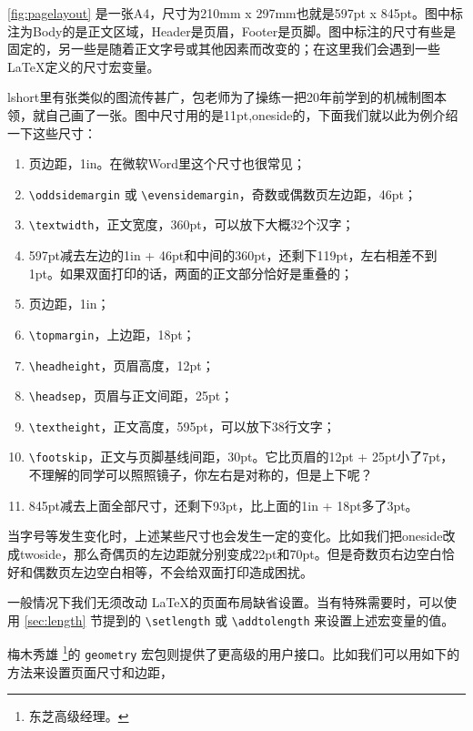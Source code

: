 \autoref{fig:pagelayout} 是一张A4，尺寸为210mm x 297mm也就是597pt x 845pt。图中标注为Body的是正文区域，Header是页眉，Footer是页脚。图中标注的尺寸有些是固定的，另一些是随着正文字号或其他因素而改变的；在这里我们会遇到一些 \LaTeX 定义的尺寸宏变量。

lshort里有张类似的图流传甚广，包老师为了操练一把20年前学到的机械制图本领，就自己画了一张。图中尺寸用的是11pt,oneside的，下面我们就以此为例介绍一下这些尺寸：

\begin{enumerate}
    \item 页边距，1in。在微软Word里这个尺寸也很常见；
    \item \verb|\oddsidemargin| 或 \verb|\evensidemargin|，奇数或偶数页左边距，46pt；
    \item \verb|\textwidth|，正文宽度，360pt，可以放下大概32个汉字；
    \item 597pt减去左边的1in + 46pt和中间的360pt，还剩下119pt，左右相差不到1pt。如果双面打印的话，两面的正文部分恰好是重叠的；
    \item 页边距，1in；
    \item \verb|\topmargin|，上边距，18pt；
    \item \verb|\headheight|，页眉高度，12pt；
    \item \verb|\headsep|，页眉与正文间距，25pt；
    \item \verb|\textheight|，正文高度，595pt，可以放下38行文字；
    \item \verb|\footskip|，正文与页脚基线间距，30pt。它比页眉的12pt + 25pt小了7pt，不理解的同学可以照照镜子，你左右是对称的，但是上下呢？
    \item 845pt减去上面全部尺寸，还剩下93pt，比上面的1in + 18pt多了3pt。
\end{enumerate}

当字号等发生变化时，上述某些尺寸也会发生一定的变化。比如我们把oneside改成twoside，那么奇偶页的左边距就分别变成22pt和70pt。但是奇数页右边空白恰好和偶数页左边空白相等，不会给双面打印造成困扰。

一般情况下我们无须改动 \LaTeX 的页面布局缺省设置。当有特殊需要时，可以使用 \ref{sec:length} 节提到的 \verb|\setlength| 或 \verb|\addtolength| 来设置上述宏变量的值。

梅木秀雄\indexUmeki{} \footnote{东芝高级经理。}的 \texttt{geometry} 宏包\citep{Umeki_2010}则提供了更高级的用户接口。比如我们可以用如下的方法来设置页面尺寸和边距，

\begin{Code}[]
\usepackage[paperwidth=100mm, paperheight=150mm, margin=20mm]{geometry}
\end{Code}

